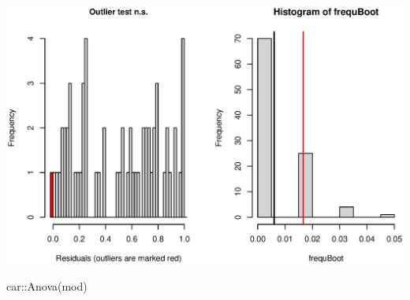 \documentclass[
  letterpaper,
  DIV=11,
  numbers=noendperiod]{scrartcl}
\newenvironment{Shaded}{\begin{snugshade}}{\end{snugshade}}
\newcommand{\FunctionTok}[1]{\textcolor[rgb]{0.28,0.35,0.67}{#1}}
\newcommand{\NormalTok}[1]{\textcolor[rgb]{0.00,0.23,0.31}{#1}}
\newcommand{\SpecialCharTok}[1]{\textcolor[rgb]{0.37,0.37,0.37}{#1}}
\begin{document}
\includegraphics{IN FIELD.eps}

\begin{Shaded}
\begin{Highlighting}[]
\NormalTok{car}\SpecialCharTok{::}\FunctionTok{Anova}\NormalTok{(mod)}
\end{Highlighting}
\end{Shaded}

 
  \providecommand{\huxb}[2]{\arrayrulecolor[RGB]{#1}\global\arrayrulewidth=#2pt}
  \providecommand{\huxvb}[2]{\color[RGB]{#1}\vrule width #2pt}
  \providecommand{\huxtpad}[1]{\rule{0pt}{#1}}
  \providecommand{\huxbpad}[1]{\rule[-#1]{0pt}{#1}}
\end{document}
